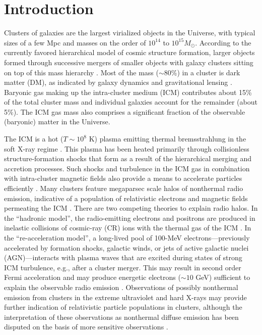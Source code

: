 \documentclass[12pt,manuscript]{aastex}
\begin{document}
%
%

\section{Introduction}
Clusters of galaxies are the largest virialized objects in the Universe, with typical sizes of a
few Mpc and masses on the order of $10^{14}$ to $10^{15} M_{\odot}$. According to the currently
favored hierarchical model of cosmic structure formation, larger objects formed through successive
mergers of smaller objects with galaxy clusters sitting on top of this mass hierarchy
\citep[see][for a review]{article:Voit:2005}. Most of the mass ($\sim$80\%) in a cluster is dark
matter (DM), as indicated by galaxy dynamics and gravitational lensing
\citep{article:DiaferioSchindlerDolag:2008}. Baryonic gas making up the intra-cluster medium (ICM)
contributes about 15\% of the total cluster mass and individual galaxies account for the remainder
(about 5\%). The ICM gas mass also comprises a significant fraction of the observable (baryonic)
matter in the Universe.

The ICM is a hot ($T\sim 10^{8}$ K) plasma emitting thermal bremsstrahlung in the soft X-ray regime
\citep[see, e.g.,][]{article:Petrosian:2001}. This plasma has been heated primarily through
collisionless structure-formation shocks that form as a result of the hierarchical merging and
accretion processes. Such shocks and turbulence in the ICM gas in combination with intra-cluster
magnetic fields also provide a means to accelerate particles efficiently \citep[see,
e.g.,][]{article:ColafrancescoBlasi:1998, article:Ryu_etal:2003}. Many clusters feature megaparsec
scale halos of nonthermal radio emission, indicative of a population of relativistic electrons
and magnetic fields permeating the ICM \citep{article:Cassano_etal:2010}. There are two competing
theories to explain radio halos. In the ``hadronic model'', the radio-emitting
electrons and positrons are produced in inelastic collisions of cosmic-ray (CR) ions with the thermal gas of the
ICM \citep{article:Dennison:1980, article:EnsslinPfrommerMiniatiSubramanian:2011}. In the
``re-acceleration model'', a long-lived pool of 100-MeV electrons---previously accelerated by
formation shocks, galactic winds, or jets of active galactic nuclei (AGN)---interacts with plasma
waves that are excited during states of strong ICM turbulence, e.g., after a cluster merger. This
may result in second order Fermi acceleration and may produce energetic electrons ($\sim 10$ GeV)
sufficient to explain the observable radio emission \citep{article:SchlickeiserSieversThiemann:1987,
article:BrunettiLazarian:2010}. Observations of possibly nonthermal emission from clusters
in the extreme ultraviolet \citep[EUV; ][]{article:SarazinLieu:1998} and hard X-rays
\citep{article:RephaeliGruber:2002, article:Fusco-Femiano_etal:2004, article:Eckert_etal:2007} may
provide further indication of relativistic particle populations in clusters, although the
interpretation of these observations as nonthermal diffuse emission has been disputed on the basis
of more sensitive observations \citep[see, e.g.,][]{article:Ajello_etal:2009,
article:Ajello_etal:2010, article:Wik_etal:2009}.
\end{document}
